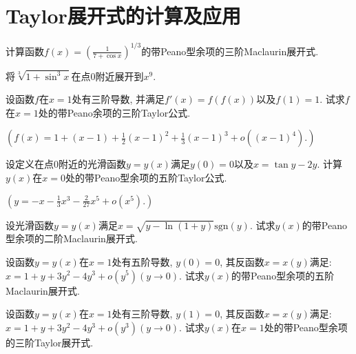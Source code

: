 \section{Taylor展开式的计算及应用}
\begin{quiza}
\woe 计算函数\(f(x)=\left(\frac{1}{7+\cos x}\right)^{1/3}\)的带Peano型余项的三阶Maclaurin展开式.
\begin{solution}

\end{solution}
\woe 将\(\sqrt[3]{1+\sin^3x}\)在点0附近展开到\(x^9\).
\begin{solution}

\end{solution}
\woe 设函数\(f\)在\(x=1\)处有三阶导数, 并满足\(f'(x)=f\left(f(x)\right)\)以及\(f(1)=1.\) 试求\(f\)在\(x=1\)处的带Peano余项的三阶Taylor公式.
\begin{solution}
\(\left(f(x)=1+(x-1)+\frac{1}{2}(x-1)^2+\frac{1}{3}(x-1)^3+o((x-1)^4).\right)\)
\end{solution}
\woe 设定义在点\(0\)附近的光滑函数\(y=y(x)\)满足\(y(0)=0\)以及\(x=\tan y-2y\). 计算\(y(x)\)在\(x=0\)处的带Peano型余项的五阶Taylor公式.
\begin{solution}
\(\left(y=-x-\frac{1}{3}x^3-\frac{2}{27}x^5+o(x^5).\right)\)
\end{solution}
\woe 设光滑函数\(y=y(x)\)满足\(x=\sqrt{y-\ln(1+y)}\mathrm{sgn}(y)\). 试求\(y(x)\)的带Peano型余项的二阶Maclaurin展开式.
\begin{solution}

\end{solution}
\woe 设函数\(y=y(x)\)在\(x=1\)处有五阶导数, \(y(0)=0\), 其反函数\(x=x(y)\)满足: \(x=1+y+3y^2-4y^3+o(y^5)(y\rightarrow 0)\). 试求\(y(x)\)的带Peano型余项的五阶Maclaurin展开式.
\begin{solution}

\end{solution}
\woe 设函数\(y=y(x)\)在\(x=1\)处有三阶导数, \(y(1)=0\), 其反函数\(x=x(y)\)满足:\(x=1+y+3y^2-4y^3+o(y^3)(y\rightarrow 0)\). 试求\(y(x)\)在\(x=1\)处的带Peano型余项的三阶Taylor展开式.
\begin{solution}


\end{solution}
\end{quiza}

